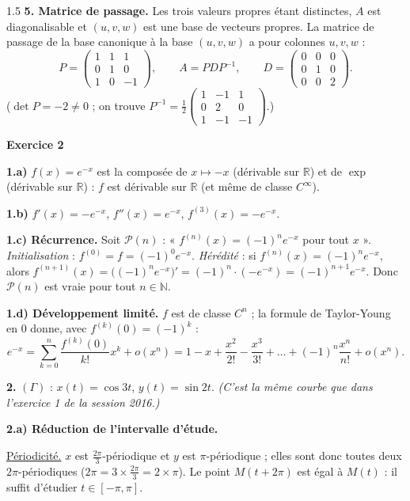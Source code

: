 \documentclass[12pt]{article}
\begin{document}
\begin{spacing}{1.5}
\textbf{5. Matrice de passage.} Les trois valeurs propres étant distinctes, $A$ est diagonalisable et $(u,v,w)$ est une base de vecteurs propres. La matrice de passage de la base canonique à la base $(u,v,w)$ a pour colonnes $u,v,w$ :
\[
\boxed{P=\begin{pmatrix}1&1&1\\0&1&0\\1&0&-1\end{pmatrix}},\qquad A=PDP^{-1},\qquad D=\begin{pmatrix}0&0&0\\0&1&0\\0&0&2\end{pmatrix}.
\]
($\det P=-2\neq0$ ; on trouve $P^{-1}=\frac12\begin{pmatrix}1&-1&1\\0&2&0\\1&-1&-1\end{pmatrix}$.)

\medskip\textbf{Exercice 2}

\textbf{1.a)} $f(x)=e^{-x}$ est la composée de $x\mapsto-x$ (dérivable sur $\mathbb{R}$) et de $\exp$ (dérivable sur $\mathbb{R}$) : $f$ est dérivable sur $\mathbb{R}$ (et même de classe $C^\infty$).

\textbf{1.b)} $f'(x)=-e^{-x}$, \quad $f''(x)=e^{-x}$, \quad $f^{(3)}(x)=-e^{-x}$.

\textbf{1.c) Récurrence.} Soit $\mathcal{P}(n)$ : « $f^{(n)}(x)=(-1)^ne^{-x}$ pour tout $x$ ».
\emph{Initialisation} : $f^{(0)}=f=(-1)^0e^{-x}$.
\emph{Hérédité} : si $f^{(n)}(x)=(-1)^ne^{-x}$, alors $f^{(n+1)}(x)=\big((-1)^ne^{-x}\big)'=(-1)^n\cdot(-e^{-x})=(-1)^{n+1}e^{-x}$.
Donc $\mathcal{P}(n)$ est vraie pour tout $n\in\mathbb{N}$.

\textbf{1.d) Développement limité.} $f$ est de classe $C^n$ ; la formule de Taylor-Young en $0$ donne, avec $f^{(k)}(0)=(-1)^k$ :
\[
e^{-x}=\sum_{k=0}^n\frac{f^{(k)}(0)}{k!}x^k+o(x^n)=\boxed{1-x+\frac{x^2}{2!}-\frac{x^3}{3!}+\dots+(-1)^n\frac{x^n}{n!}+o(x^n)}.
\]

\textbf{2.} $(\Gamma)$ : $x(t)=\cos3t$, $y(t)=\sin2t$. \emph{(C'est la même courbe que dans l'exercice 1 de la session 2016.)}

\textbf{2.a) Réduction de l'intervalle d'étude.}

\underline{Périodicité.} $x$ est $\frac{2\pi}{3}$-périodique et $y$ est $\pi$-périodique ; elles sont donc toutes deux $2\pi$-périodiques ($2\pi=3\times\frac{2\pi}3=2\times\pi$). Le point $M(t+2\pi)$ est égal à $M(t)$ : il suffit d'étudier $t\in[-\pi,\pi]$.


\end{spacing}
\end{document}
